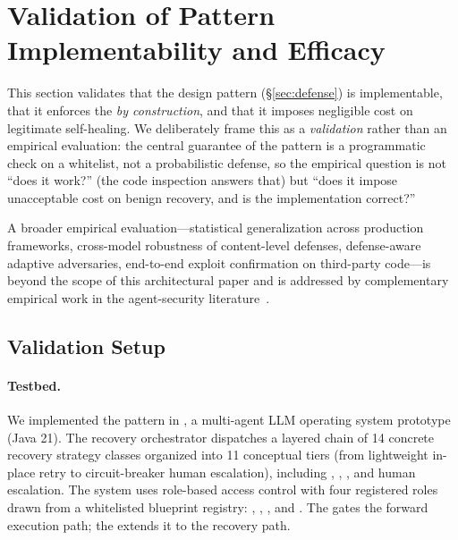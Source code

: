 
\section{Validation of Pattern Implementability and Efficacy}
\label{sec:evaluation}

This section validates that the \reauthgate{} design pattern (\S\ref{sec:defense}) is implementable, that it enforces the \privinv{} \emph{by construction}, and that it imposes negligible cost on legitimate self-healing. We deliberately frame this as a \emph{validation} rather than an empirical evaluation: the central guarantee of the pattern is a programmatic check on a whitelist, not a probabilistic defense, so the empirical question is not ``does it work?'' (the code inspection answers that) but ``does it impose unacceptable cost on benign recovery, and is the implementation correct?''

A broader empirical evaluation---statistical generalization across production frameworks, cross-model robustness of content-level defenses, defense-aware adaptive adversaries, end-to-end exploit confirmation on third-party code---is beyond the scope of this architectural paper and is addressed by complementary empirical work in the agent-security literature~\cite{debenedetti2025camel,zhan2025adaptive}.

\subsection{Validation Setup}

\paragraph{Testbed.}
We implemented the \reauthgate{} pattern in \system{}, a multi-agent LLM operating system prototype (Java 21). The recovery orchestrator dispatches a layered chain of 14 concrete recovery strategy classes organized into 11 conceptual tiers (from lightweight in-place retry to circuit-breaker human escalation), including , , , and human escalation. The system uses role-based access control with four registered roles drawn from a whitelisted blueprint registry: , , , and . The  gates the forward execution path; the \reauthgate{} extends it to the recovery path.


